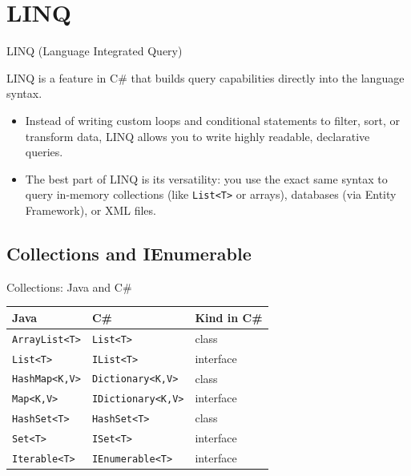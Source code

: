 
\section{LINQ}


\begin{frame}{LINQ (Language Integrated Query)}

  LINQ is a feature in C\# that builds query capabilities directly into the language syntax.

  \begin{itemize}
    \item Instead of writing custom loops and conditional statements to filter, sort, or transform data, LINQ allows you to write highly readable, declarative queries.
    \item The best part of LINQ is its versatility: you use the exact same syntax to query in-memory collections (like \texttt{List<T>} or arrays), databases (via Entity Framework), or XML files.
  \end{itemize}

\end{frame}

\subsection{Collections and IEnumerable}

\begin{frame}{Collections: Java and C\#}
  \begin{center}
    \footnotesize
    \begin{tabular}{lll}
      \hline
      \textbf{Java} & \textbf{C\#} & \textbf{Kind in C\#}\\
      \hline
      \texttt{ArrayList<T>}  & \texttt{List<T>}            & class\\
      \texttt{List<T>}       & \texttt{IList<T>}           & interface\\
      \texttt{HashMap<K,V>}  & \texttt{Dictionary<K,V>}    & class\\
      \texttt{Map<K,V>}      & \texttt{IDictionary<K,V>}   & interface\\
      \texttt{HashSet<T>}    & \texttt{HashSet<T>}         & class\\
      \texttt{Set<T>}        & \texttt{ISet<T>}            & interface\\
      \texttt{Iterable<T>}   & \texttt{IEnumerable<T>}     & interface\\
      \hline
    \end{tabular}
  \end{center}
  \vspace{1ex}

\end{frame}

